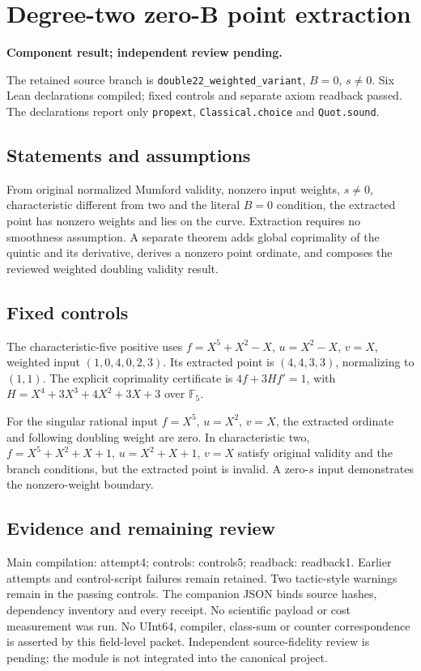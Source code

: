 \documentclass[11pt]{article}
\begin{document}
\section*{Degree-two zero-B point extraction}
\textbf{Component result; independent review pending.}

The retained source branch is \texttt{double22\_weighted\_variant}, $B=0$, $s\ne0$. Six Lean declarations compiled; fixed controls and separate axiom readback passed. The declarations report only \texttt{propext}, \texttt{Classical.choice} and \texttt{Quot.sound}.
\subsection*{Statements and assumptions}
From original normalized Mumford validity, nonzero input weights, $s\ne0$, characteristic different from two and the literal $B=0$ condition, the extracted point has nonzero weights and lies on the curve. Extraction requires no smoothness assumption. A separate theorem adds global coprimality of the quintic and its derivative, derives a nonzero point ordinate, and composes the reviewed weighted doubling validity result.
\subsection*{Fixed controls}
The characteristic-five positive uses $f=X^5+X^2-X$, $u=X^2-X$, $v=X$, weighted input $(1,0,4,0,2,3)$. Its extracted point is $(4,4,3,3)$, normalizing to $(1,1)$. The explicit coprimality certificate is $4f+3Hf'=1$, with $H=X^4+3X^3+4X^2+3X+3$ over $\mathbb F_5$.

For the singular rational input $f=X^5$, $u=X^2$, $v=X$, the extracted ordinate and following doubling weight are zero. In characteristic two, $f=X^5+X^2+X+1$, $u=X^2+X+1$, $v=X$ satisfy original validity and the branch conditions, but the extracted point is invalid. A zero-$s$ input demonstrates the nonzero-weight boundary.
\subsection*{Evidence and remaining review}
Main compilation: attempt4; controls: controls5; readback: readback1. Earlier attempts and control-script failures remain retained. Two tactic-style warnings remain in the passing controls. The companion JSON binds source hashes, dependency inventory and every receipt. No scientific payload or cost measurement was run. No UInt64, compiler, class-sum or counter correspondence is asserted by this field-level packet. Independent source-fidelity review is pending; the module is not integrated into the canonical project.
\end{document}
